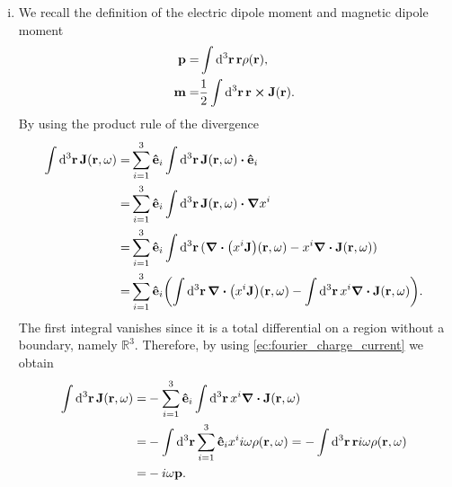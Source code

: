 \documentclass{article}
\begin{document}
\begin{enumerate}[(i)]
\item We recall the definition of the electric dipole moment and magnetic dipole moment
\begin{align}
\begin{split}
\vb{p}=&\int\dd[3]{\vb{r}}\vb{r}\rho(\vb{r}),\\
\vb{m}=&\frac{1}{2}\int\dd[3]{\vb{r}}\vb{r}\cross\vb{J}(\vb{r}).
\end{split}
\end{align}
By using the product rule of the divergence
\begin{align}
\begin{split}
\int\dd[3]{\vb{r}}\vb{J}(\vb{r},\omega)=&\sum_{i=1}^3\vu{e}_i\int\dd[3]{\vb{r}}\vb{J}(\vb{r},\omega)\vdot\vu{e}_{i}\\
=&\sum_{i=1}^3\vu{e}_i\int\dd[3]{\vb{r}}\vb{J}(\vb{r},\omega)\vdot\grad{x^i}\\
=&\sum_{i=1}^3\vu{e}_i\int\dd[3]{\vb{r}}(\div(x^i\vb{J})(\vb{r},\omega)-x^i\div{\vb{J}}(\vb{r},\omega))\\
=&\sum_{i=1}^3\vu{e}_i\qty(\int\dd[3]{\vb{r}}\div(x^i\vb{J})(\vb{r},\omega)-\int\dd[3]{\vb{r}}x^i\div{\vb{J}}(\vb{r},\omega)).
\end{split}
\end{align}
The first integral vanishes since it is a total differential on a region without a boundary, namely $\mathbb{R}^3$. Therefore, by using \eqref{ec:fourier_charge_current} we obtain
\begin{align}\label{ec:integral_current}
\begin{split}
\int\dd[3]{\vb{r}}\vb{J}(\vb{r},\omega)=&-\sum_{i=1}^3\vu{e}_i\int\dd[3]{\vb{r}}x^i\div{\vb{J}}(\vb{r},\omega)\\
=&-\int\dd[3]{\vb{r}}\sum_{i=1}^3\vu{e}_ix^ii\omega\rho(\vb{r},\omega)=-\int\dd[3]{\vb{r}}\vb{r}i\omega\rho(\vb{r},\omega)\\
=&-i\omega\vb{p}.
\end{split}
\end{align}


\end{enumerate}
\end{document}
